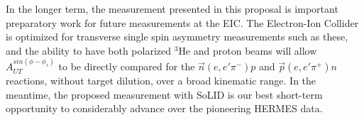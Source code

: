 In the longer term, the measurement presented in this proposal is important
preparatory work for future measurements at the EIC.  The Electron-Ion Collider
is optimized for transverse single spin asymmetry measurements such as these,
and the ability to have both polarized $^3$He and proton beams will allow
$A_{UT}^{sin(\phi-\phi_s)}$ to be directly compared for the
$\vec{n}(e,e'\pi^-)p$ and $\vec{p}(e,e'\pi^+)n$ reactions, without target
dilution, over a broad kinematic range.  In the meantime, the proposed
measurement with SoLID is our best short-term opportunity to considerably
advance over the pioneering HERMES data.

